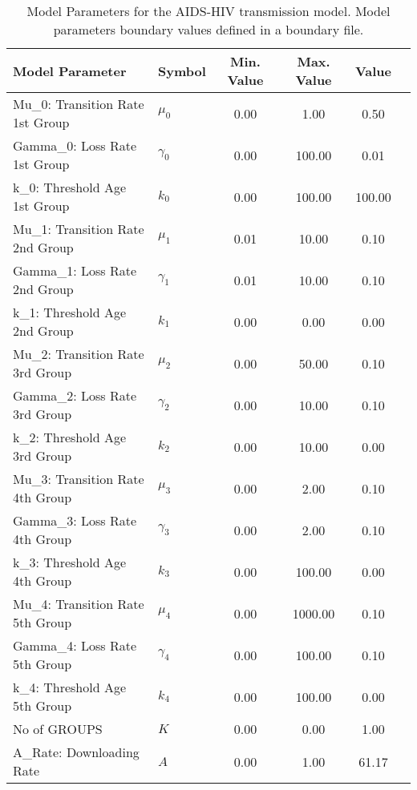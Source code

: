 \begin{table}
\centering
\begin{tabular}{p{5cm}lcccc}
{\bf Model Parameter} & {\bf Symbol} & {\bf Min. Value} & {\bf Max. Value} & {\bf Value}\\
\hline\hline
Mu_0: Transition Rate 1st Group & $\mu_0$ & 0.00 & 1.00 & 0.50\\
Gamma_0: Loss Rate 1st Group & $\gamma_0$ & 0.00 & 100.00 & 0.01\\
k_0: Threshold Age 1st Group & $k_0$ & 0.00 & 100.00 & 100.00\\
Mu_1: Transition Rate 2nd Group & $\mu_1$ & 0.01 & 10.00 & 0.10\\
Gamma_1: Loss Rate 2nd Group & $\gamma_1$ & 0.01 & 10.00 & 0.10\\
k_1: Threshold Age 2nd Group & $k_1$ & 0.00 & 0.00 & 0.00\\
Mu_2: Transition Rate 3rd Group & $\mu_2$ & 0.00 & 50.00 & 0.10\\
Gamma_2: Loss Rate 3rd Group & $\gamma_2$ & 0.00 & 10.00 & 0.10\\
k_2: Threshold Age 3rd Group & $k_2$ & 0.00 & 10.00 & 0.00\\
Mu_3: Transition Rate 4th Group & $\mu_3$ & 0.00 & 2.00 & 0.10\\
Gamma_3: Loss Rate 4th Group & $\gamma_3$ & 0.00 & 2.00 & 0.10\\
k_3: Threshold Age 4th Group & $k_3$ & 0.00 & 100.00 & 0.00\\
Mu_4: Transition Rate 5th Group & $\mu_4$ & 0.00 & 1000.00 & 0.10\\
Gamma_4: Loss Rate 5th Group & $\gamma_4$ & 0.00 & 100.00 & 0.10\\
k_4: Threshold Age 5th Group & $k_4$ & 0.00 & 100.00 & 0.00\\
No of GROUPS & $K$ & 0.00 & 0.00 & 1.00\\
A_Rate: Downloading Rate & $A$ & 0.00 & 1.00 & 61.17\\
\hline\hline
\end{tabular}
\caption{Model Parameters for the AIDS-HIV transmission model. Model parameters boundary values defined in a boundary file.}
\end{table}
